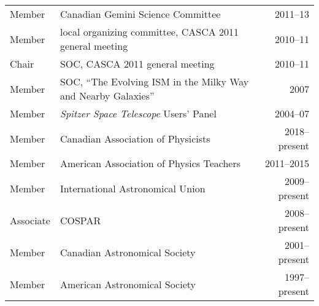 \begin{tabularx}{\textwidth}{lXr}
Member& Canadian Gemini Science Committee& 2011--13\\
Member& local organizing committee, CASCA 2011 general meeting&2010--11\\
Chair& SOC, CASCA 2011 general meeting&2010--11\\
Member& SOC, ``The Evolving ISM in the Milky Way and Nearby Galaxies'' & 2007\\
Member& {\it Spitzer Space Telescope} Users' Panel& 2004--07\\
Member& Canadian Association of Physicists& 2018--present\\
Member& American Association of Physics Teachers& 2011--2015\\
Member& International Astronomical Union& 2009--present\\
Associate& COSPAR& 2008--present\\
Member& Canadian Astronomical Society& 2001--present\\
Member& American Astronomical Society& 1997--present
\end{tabularx}
